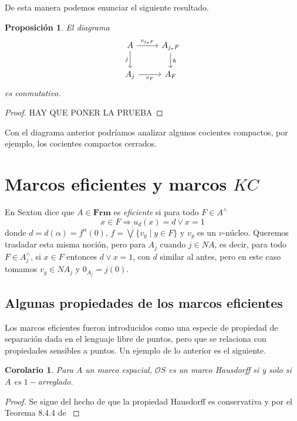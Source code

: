 \documentclass[11pt]{amsart}
\theoremstyle{plain}
\newtheorem{cor}[thm]{Corolario}
\newtheorem{prop}[thm]{Proposición}
\theoremstyle{definition}
\begin{document}
De esta manera podemos enunciar el siguiente resultado.

\begin{prop}\label{VFsquare}
El diagrama
\[\begin{tikzcd}
	A & {A_{j_*F}} \\
	{A_j} & {A_F}
	\arrow["{v_{j_*F}}", from=1-1, to=1-2]
	\arrow["j"', from=1-1, to=2-1]
	\arrow["h", from=1-2, to=2-2]
	\arrow["{v_F}"', from=2-1, to=2-2]
\end{tikzcd}\]
es conmutativo.
\end{prop}

\begin{proof}
HAY QUE PONER LA PRUEBA
\end{proof}

Con el diagrama anterior podríamos analizar algunos cocientes compactos, por ejemplo, los cocientes compactos cerrados.


\section{Marcos eficientes y marcos $KC$}

En \cite{sexton2006point} Sexton dice que $A\in \mathbf{Frm}$ es \emph{eficiente} si para todo $F\in A^\wedge$
\[
x\in F\Rightarrow u_d(x)=d\vee x=1
\]
donde $d=d(\alpha)=f^\alpha(0)$, $f=\dot{\bigvee}\{v_y\mid y\in F\}$ y $v_y$ es un $v$-núcleo. Queremos trasladar esta misma noción, pero para $A_j$ cuando $j\in NA$, es decir, para todo $F\in A_j^\wedge$, si $x\in F$ entonces $d\vee x=1$, con $d$ similar al antes, pero en este caso tomamos $v_y\in NA_j$ y $0_{A_j}=j(0)$.\\

\subsection{Algunas propiedades de los marcos eficientes}
Los marcos eficientes fueron introducidos como una especie de propiedad de separación dada en el lenguaje 
libre de puntos, pero que se relaciona con propiedades sensibles a puntos. Un ejemplo de lo anterior es el
siguiente.

\begin{cor}
    Para $A$ un marco espacial, $\mathcal{O}S$ es un marco Hausdorff si y solo si $A$ es $1-$arreglado.
\end{cor}

\begin{proof}
    Se sigue del hecho de que la propiedad Hausdorff es conservativa y por el Teorema 8.4.4 de \cite{sexton2006point}
\end{proof}
\end{document}
